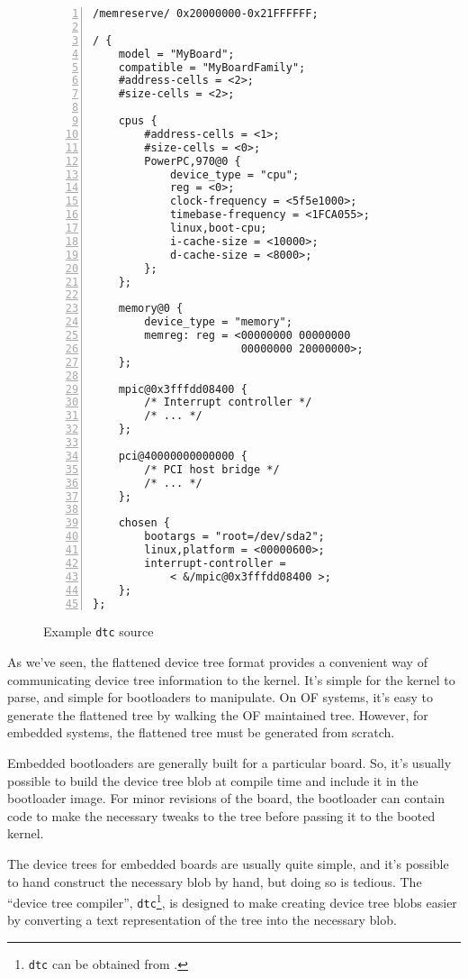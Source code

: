 \documentclass[a4paper,twocolumn]{article}
\newcommand{\dtc}{\texttt{dtc}\xspace}
\begin{document}
\begin{figure}[htb!]
  \centering
  \begin{lstlisting}[frame=single,basicstyle=\footnotesize\ttfamily,
    tabsize=3,numbers=left,xleftmargin=2em]
/memreserve/ 0x20000000-0x21FFFFFF;

/ {
	model = "MyBoard";
	compatible = "MyBoardFamily";
	#address-cells = <2>;
	#size-cells = <2>;

	cpus {
		#address-cells = <1>;
		#size-cells = <0>;
		PowerPC,970@0 {
			device_type = "cpu";
			reg = <0>;
			clock-frequency = <5f5e1000>;
			timebase-frequency = <1FCA055>;
			linux,boot-cpu;
			i-cache-size = <10000>;
			d-cache-size = <8000>;
		};
	};

	memory@0 {
		device_type = "memory";
		memreg: reg = <00000000 00000000
		               00000000 20000000>;
	};

	mpic@0x3fffdd08400 {
		/* Interrupt controller */
		/* ... */
	};

	pci@40000000000000 {
		/* PCI host bridge */
		/* ... */
	};

	chosen {
		bootargs = "root=/dev/sda2";
		linux,platform = <00000600>;
		interrupt-controller =
			< &/mpic@0x3fffdd08400 >;
	};
};
\end{lstlisting}
  \caption{Example \dtc source}
  \label{fig:dts}
\end{figure}

As we've seen, the flattened device tree format provides a convenient
way of communicating device tree information to the kernel.  It's
simple for the kernel to parse, and simple for bootloaders to
manipulate.  On OF systems, it's easy to generate the flattened tree
by walking the OF maintained tree.  However, for embedded systems, the
flattened tree must be generated from scratch.

Embedded bootloaders are generally built for a particular board.  So,
it's usually possible to build the device tree blob at compile time
and include it in the bootloader image.  For minor revisions of the
board, the bootloader can contain code to make the necessary tweaks to
the tree before passing it to the booted kernel.

The device trees for embedded boards are usually quite simple, and
it's possible to hand construct the necessary blob by hand, but doing
so is tedious.  The ``device tree compiler'', \dtc{}\footnote{\dtc can
be obtained from \cite{dtcgit}.}, is designed to make creating device
tree blobs easier by converting a text representation of the tree
into the necessary blob.
\end{document}
